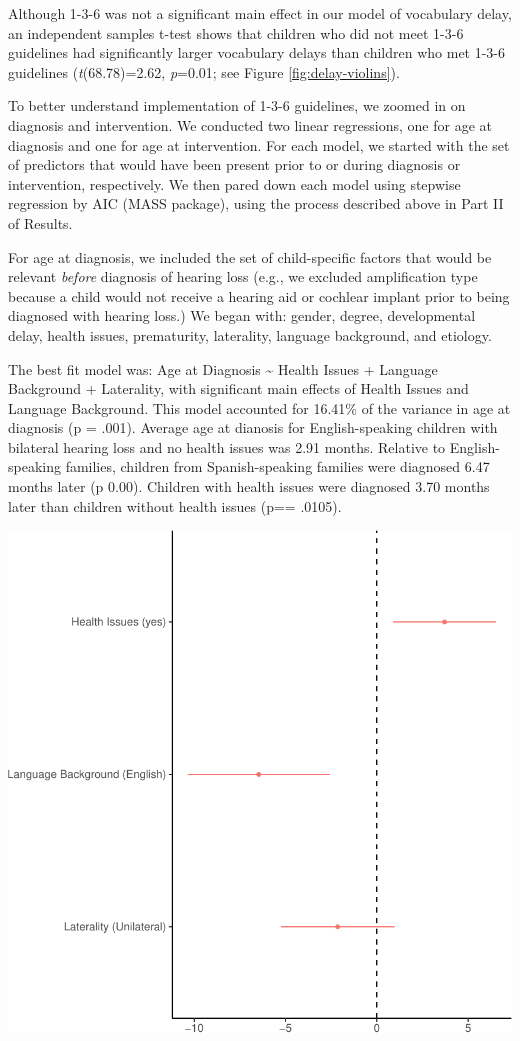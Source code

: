 \documentclass[english,man]{apa6}
\begin{document}
Although 1-3-6 was not a significant main effect in our model of vocabulary delay, an independent samples t-test shows that children who did not meet 1-3-6 guidelines had significantly larger vocabulary delays than children who met 1-3-6 guidelines (\emph{t}(68.78)=2.62, \emph{p}=0.01; see Figure \ref{fig:delay-violins}).

To better understand implementation of 1-3-6 guidelines, we zoomed in on diagnosis and intervention. We conducted two linear regressions, one for age at diagnosis and one for age at intervention. For each model, we started with the set of predictors that would have been present prior to or during diagnosis or intervention, respectively. We then pared down each model using stepwise regression by AIC (MASS package), using the process described above in Part II of Results.

For age at diagnosis, we included the set of child-specific factors that would be relevant \emph{before} diagnosis of hearing loss (e.g., we excluded amplification type because a child would not receive a hearing aid or cochlear implant prior to being diagnosed with hearing loss.) We began with: gender, degree, developmental delay, health issues, prematurity, laterality, language background, and etiology.

The best fit model was: Age at Diagnosis \textasciitilde{} Health Issues + Language Background + Laterality, with significant main effects of Health Issues and Language Background. This model accounted for 16.41\% of the variance in age at diagnosis (p = .001). Average age at dianosis for English-speaking children with bilateral hearing loss and no health issues was 2.91 months. Relative to English-speaking families, children from Spanish-speaking families were diagnosed 6.47 months later (p 0.00). Children with health issues were diagnosed 3.70 months later than children without health issues (p== .0105).

\includegraphics{ELSSP_paper_files/figure-latex/diagnosis-betas-1.pdf}
\end{document}
